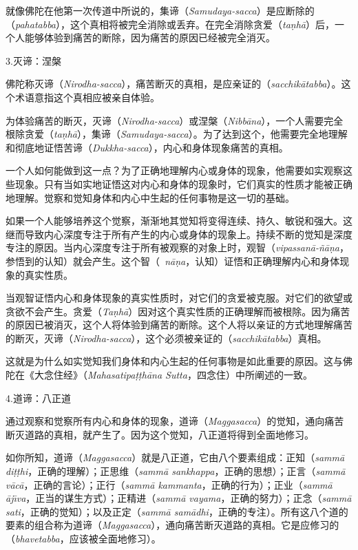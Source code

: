 就像佛陀在他第一次传道中所说的，集谛（{\it Samudaya-sacca}）是应断除的（{\it pahatabba}），这个真相将被完全消除或丢弃。在完全消除贪爱（{\it ta\d nh\=a}）后，一个人能够体验到痛苦的断除，因为痛苦的原因已经被完全消灭。

\sssubsectnon 3.灭谛：涅槃

佛陀称灭谛（{\it Nirodha-sacca}），痛苦断灭的真相，是应亲证的（{\it sacchik\=atabba}）。这个术语意指这个真相应被亲自体验。

为体验痛苦的断灭，灭谛（{\it Nirodha-sacca}）或涅槃（{\it Nibb\=ana}），一个人需要完全根除贪爱（{\it ta\d nh\=a}），集谛（{\it Samudaya-sacca}）。为了达到这个，他需要完全地理解和彻底地证悟苦谛（{\it Dukkha-sacca}），内心和身体现象痛苦的真相。

一个人如何能做到这一点？为了正确地理解内心或身体的现象，他需要如实观察这些现象。只有当如实地证悟这对内心和身体的现象时，它们真实的性质才能被正确地理解。觉察和觉知身体和内心中生起的任何事物是这一切的基础。

如果一个人能够培养这个觉察，渐渐地\1其觉知将变得连续、持久、敏锐和强大。这继而导致内心深度专注于所有产生的内心或身体的现象上。持续不断的觉知是深度专注的原因。当内心深度专注于所有被观察的对象上时，观智（{\it vipassan\=a-\~n\=a\d na}，参悟到的认知）就会产生。这个智（{\it ~n\=a\d na}，认知）证悟和正确理解内心和身体现象的真实性质。

当观智证悟内心和身体现象的真实性质时，对它们的贪爱被克服。对它们的欲望或贪欲不会产生。贪爱（{\it Ta\d nh\=a}）因对这个真实性质的正确理解而被根除。因为痛苦的原因已被消灭，这个人将体验到痛苦的断除。这个人将以亲证的方式地理解痛苦的断灭，灭谛（{\it Nirodha-sacca}），这个必须被亲证的（{\it sacchik\=atabba}）真相。

这就是为什么如实觉知我们身体和内心生起的任何事物是如此重要的原因。这与佛陀在《大念住经》（{\it Mahasatipa\d t\d th\=ana Sutta}，四念住）中所阐述的一致。

\sssubsectnon 4.道谛：八正道

通过观察和觉察所有内心和身体的现象，道谛（{\it Maggasacca}）的觉知，通向痛苦断灭道路的真相，就产生了。因为这个觉知，八正道将得到全面地修习。

如你所知，道谛（{\it Maggasacca}）就是八正道，它由八个要素组成：\1正知（{\it samm\=a di\d t\d thi}，正确的理解）；正思维（{\it samm\=a sankhappa}，正确的思想）；正言（{\it samm\=a v\=ac\=a}，正确的言论）；正行（{\it samm\=a kammanta}，正确的行为）；正业（{\it samm\=a \=aj\=\i va}，正当的谋生方式）；正精进（{\it samm\=a vayama}，正确的努力）；正念（{\it samm\=a sati}，正确的觉知）；以及正定（{\it samm\=a sam\=adhi}，正确的专注）。所有这八个道的要素的组合称为道谛（{\it Maggasacca}），通向痛苦断灭道路的真相。它是应修习的（{\it bhavetabba}，应该被全面地修习）。

